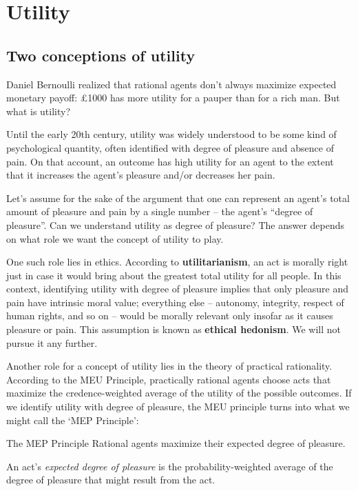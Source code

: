 \chapter{Utility}\label{ch:utility}


\section{Two conceptions of utility}

Daniel Bernoulli realized that rational agents don't always maximize expected
monetary payoff: £1000 has more utility for a pauper than for a rich man. But
what is utility?

Until the early 20th century, utility was widely understood to be some kind of
psychological quantity, often identified with degree of pleasure and absence of
pain. On that account, an outcome has high utility for an agent to the extent
that it increases the agent's pleasure and/or decreases her pain.

Let's assume for the sake of the argument that one can represent an agent's
total amount of pleasure and pain by a single number -- the agent's ``degree of
pleasure''. Can we understand utility as degree of pleasure? The answer depends
on what role we want the concept of utility to play.

One such role lies in ethics. According to \textbf{utilitarianism}, an act is
morally right just in case it would bring about the greatest total utility for
all people. In this context, identifying utility with degree of pleasure implies
that only pleasure and pain have intrinsic moral value; everything else --
autonomy, integrity, respect of human rights, and so on -- would be morally
relevant only insofar as it causes pleasure or pain. This assumption is known as
\textbf{ethical hedonism}. We will not pursue it any further.

Another role for a concept of utility lies in the theory of practical
rationality. According to the MEU Principle, practically rational agents choose
acts that maximize the credence-weighted average of the utility of the possible
outcomes. If we identify utility with degree of pleasure, the MEU principle
turns into what we might call the `MEP Principle':
%
\begin{genericthm}{The MEP Principle}
  Rational agents maximize their expected degree of pleasure. 
\end{genericthm}
%
\noindent%
An act's \emph{expected degree of pleasure} is the
probability-weighted average of the degree of pleasure that might
result from the act. 

